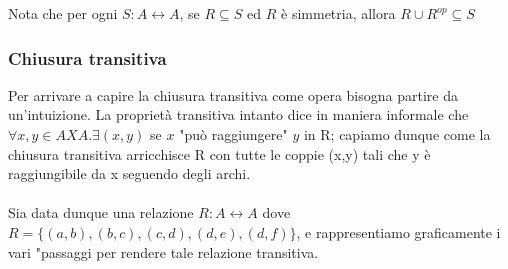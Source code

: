 \begin{note}
Nota che per ogni $S: A \longleftrightarrow A$, se $R \subseteq S$ ed $R$ è simmetria, allora $R \cup R^{op} \subseteq S$ 
\end{note}

\subsubsection{Chiusura transitiva}
Per arrivare a capire la chiusura transitiva come opera bisogna partire da un'intuizione. La proprietà transitiva intanto dice in maniera informale che $\forall x,y \in A X A. \exists (x,y)$ se $x$ "può raggiungere" $y$ in R; capiamo dunque come la chiusura transitiva arricchisce R con tutte le coppie (x,y) tali che y è raggiungibile da x seguendo degli archi.\\ \\
Sia data dunque una relazione $R: A \longleftrightarrow A$ dove $R = \{(a,b), (b,c), (c,d), (d,e), (d,f)\}$, e rappresentiamo graficamente i vari "passaggi per rendere tale relazione transitiva.
